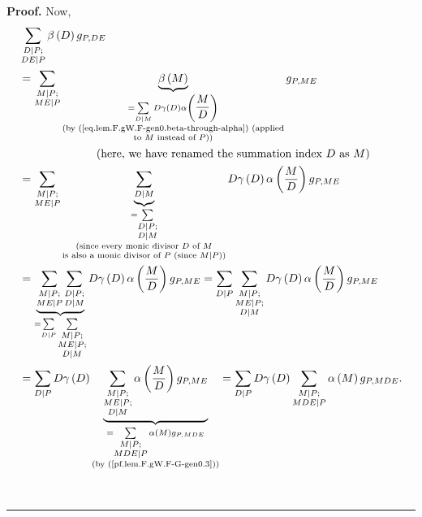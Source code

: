 \documentclass[numbers=enddot,12pt,final,onecolumn,notitlepage]{scrartcl}%
\theoremstyle{definition}
\newenvironment{proof}[1][Proof]{\noindent\textbf{#1.} }{\ \rule{0.5em}{0.5em}}
\let\sumnonlimits\sum
\renewcommand{\sum}{\sumnonlimits\limits}
\begin{document}
\begin{proof}
Now,%
\begin{align*}
&  \sum_{\substack{D\mid P;\\DE\mid P}}\beta\left(  D\right)  g_{P,DE}\\
&  =\sum_{\substack{M\mid P;\\ME\mid P}}\underbrace{\beta\left(  M\right)
}_{\substack{=\sum_{D\mid M}D\gamma\left(  D\right)  \alpha\left(  \dfrac
{M}{D}\right)  \\\text{(by (\ref{eq.lem.F.gW.F-gen0.beta-through-alpha})
(applied}\\\text{to }M\text{ instead of }P\text{))}}}g_{P,ME}\\
&  \ \ \ \ \ \ \ \ \ \ \ \ \ \ \ \ \ \ \ \ \left(  \text{here, we have renamed
the summation index }D\text{ as }M\right)  \\
&  =\sum_{\substack{M\mid P;\\ME\mid P}}\underbrace{\sum_{D\mid M}%
}_{\substack{=\sum_{\substack{D\mid P;\\D\mid M}}\\\text{(since every monic
divisor }D\text{ of }M\\\text{is also a monic divisor of }P\text{ (since
}M\mid P\text{))}}}D\gamma\left(  D\right)  \alpha\left(  \dfrac{M}{D}\right)
g_{P,ME}\\
&  =\underbrace{\sum_{\substack{M\mid P;\\ME\mid P}}\sum_{\substack{D\mid
P;\\D\mid M}}}_{=\sum_{D\mid P}\sum_{\substack{M\mid P;\\ME\mid P;\\D\mid M}%
}}D\gamma\left(  D\right)  \alpha\left(  \dfrac{M}{D}\right)  g_{P,ME}%
=\sum_{D\mid P}\sum_{\substack{M\mid P;\\ME\mid P;\\D\mid M}}D\gamma\left(
D\right)  \alpha\left(  \dfrac{M}{D}\right)  g_{P,ME}\\
&  =\sum_{D\mid P}D\gamma\left(  D\right)  \underbrace{\sum_{\substack{M\mid
P;\\ME\mid P;\\D\mid M}}\alpha\left(  \dfrac{M}{D}\right)  g_{P,ME}%
}_{\substack{=\sum_{\substack{M\mid P;\\MDE\mid P}}\alpha\left(  M\right)
g_{P,MDE}\\\text{(by (\ref{pf.lem.F.gW.F-G-gen0.3}))}}}=\sum_{D\mid P}%
D\gamma\left(  D\right)  \sum_{\substack{M\mid P;\\MDE\mid P}}\alpha\left(
M\right)  g_{P,MDE}.
\end{align*}

\end{proof}
\end{document}
